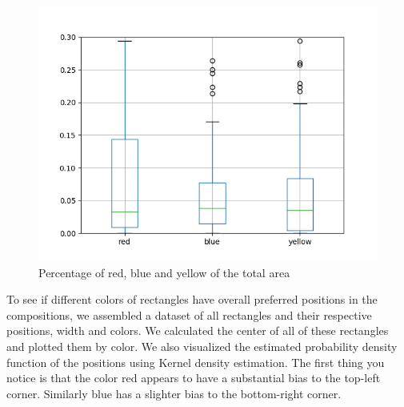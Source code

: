 \begin{figure}
\includegraphics[width=\linewidth]{images/colors-rby.png}
\caption{Percentage of red, blue and yellow of the total area}
\label{fig:colors-rby}
\end{figure}

To see if different colors of rectangles have overall preferred positions in the
compositions, we assembled a dataset of all rectangles and their respective
positions, width and colors. We calculated the center of all of these rectangles
and plotted them by color. We also visualized the estimated probability density
function of the positions using Kernel density estimation. The first thing you
notice is that the color red appears to have a substantial bias to the top-left
corner. Similarly blue has a slighter bias to the bottom-right corner.

